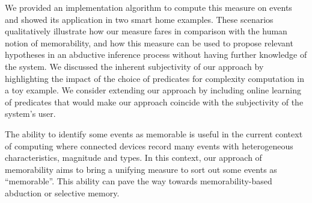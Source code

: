 \documentclass[entropy,article,submit,moreauthors,pdftex]{Definitions/mdpi}
\begin{document}

We provided an implementation algorithm to compute this measure on events and showed its application in two smart home examples. These scenarios qualitatively illustrate how our measure fares in comparison with the human notion of memorability, and how this measure can be used to propose relevant hypotheses in an abductive inference process without having further knowledge of the system. We discussed the inherent subjectivity of our approach by highlighting the impact of the choice of predicates for complexity computation in a toy example. We consider extending our approach by including online learning of predicates that would make our approach coincide with the subjectivity of the system's user.

The ability to identify some events as memorable is useful in the current context of computing where connected devices record many events with heterogeneous characteristics, magnitude and types. In this context, our approach of memorability aims to bring a unifying measure to sort out some events as ``memorable''. This ability can pave the way towards memorability-based abduction or selective memory.


\vspace{6pt}

\end{document}
